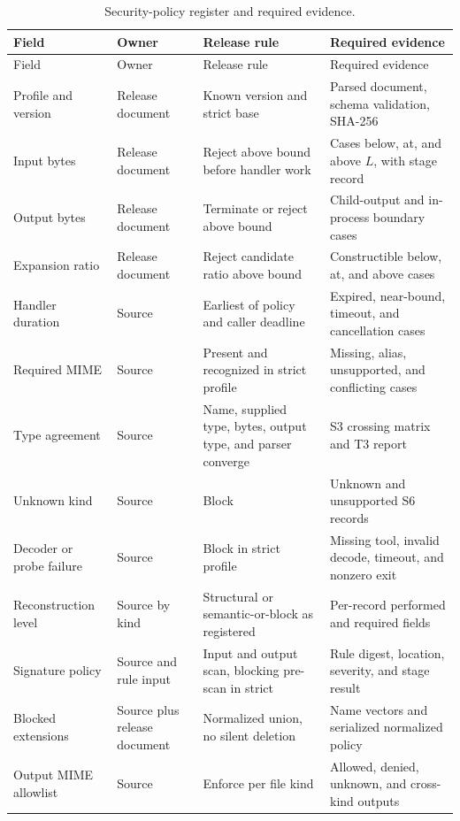 \begingroup
\footnotesize
\setlength{\tabcolsep}{5pt}
\begin{longtable}{L{0.20\textwidth}L{0.14\textwidth}L{0.23\textwidth}L{0.24\textwidth}}
\caption{Security-policy register and required evidence.}
\label{tab:policy-register}\\
\toprule
Field & Owner & Release rule & Required evidence \\
\midrule
\endfirsthead
\toprule
Field & Owner & Release rule & Required evidence \\
\midrule
\endhead
Profile and version & Release document & Known version and strict base & Parsed document, schema validation, SHA-256 \\
Input bytes & Release document & Reject above bound before handler work & Cases below, at, and above $L$, with stage record \\
Output bytes & Release document & Terminate or reject above bound & Child-output and in-process boundary cases \\
Expansion ratio & Release document & Reject candidate ratio above bound & Constructible below, at, and above cases \\
Handler duration & Source & Earliest of policy and caller deadline & Expired, near-bound, timeout, and cancellation cases \\
Required MIME & Source & Present and recognized in strict profile & Missing, alias, unsupported, and conflicting cases \\
Type agreement & Source & Name, supplied type, bytes, output type, and parser converge & S3 crossing matrix and T3 report \\
Unknown kind & Source & Block & Unknown and unsupported S6 records \\
Decoder or probe failure & Source & Block in strict profile & Missing tool, invalid decode, timeout, and nonzero exit \\
Reconstruction level & Source by kind & Structural or semantic-or-block as registered & Per-record performed and required fields \\
Signature policy & Source and rule input & Input and output scan, blocking pre-scan in strict & Rule digest, location, severity, and stage result \\
Blocked extensions & Source plus release document & Normalized union, no silent deletion & Name vectors and serialized normalized policy \\
Output MIME allowlist & Source & Enforce per file kind & Allowed, denied, unknown, and cross-kind outputs \\

\end{longtable}
